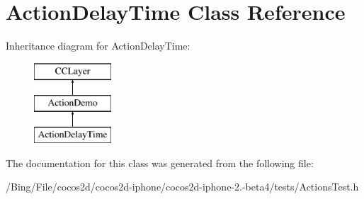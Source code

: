\hypertarget{interface_action_delay_time}{\section{Action\-Delay\-Time Class Reference}
\label{interface_action_delay_time}
}
Inheritance diagram for Action\-Delay\-Time\-:\begin{figure}[H]
\begin{center}
\leavevmode
\includegraphics[height=3.000000cm]{interface_action_delay_time}
\end{center}
\end{figure}


The documentation for this class was generated from the following file\-:\begin{DoxyCompactItemize}
\item 
/\-Bing/\-File/cocos2d/cocos2d-\/iphone/cocos2d-\/iphone-\/2.-\/beta4/tests/Actions\-Test.\-h\end{DoxyCompactItemize}
